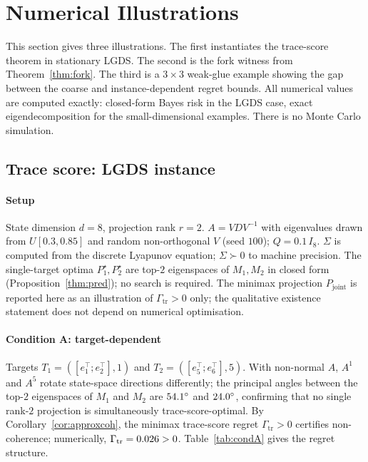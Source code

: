 \documentclass[final,3p,times]{elsarticle}
\begin{document}
\section{Numerical Illustrations}
\label{sec:numerics}

This section gives three illustrations.
The first instantiates the trace-score theorem in stationary LGDS.
The second is the fork witness from Theorem~\ref{thm:fork}.
The third is a $3\times 3$ weak-glue example showing the gap between the
coarse and instance-dependent regret bounds.
All numerical values are computed exactly: closed-form Bayes risk in the
LGDS case, exact eigendecomposition for the small-dimensional examples.
There is no Monte Carlo simulation.

\subsection{Trace score: LGDS instance}

\paragraph{Setup}
State dimension $d=8$, projection rank $r=2$.
$A=VDV^{-1}$ with eigenvalues drawn from $U[0.3,0.85]$ and random
non-orthogonal $V$ (seed $100$); $Q=0.1\,I_8$.
$\Sigma$ is computed from the discrete Lyapunov equation; $\Sigma\succ 0$
to machine precision.
The single-target optima $P_1^\star,P_2^\star$ are top-$2$ eigenspaces
of $M_1,M_2$ in closed form (Proposition~\ref{thm:pred}); no search is
required.
The minimax projection $P_{\mathrm{joint}}$ is reported here as an
illustration of $\Gamma_{\mathrm{tr}}>0$ only; the qualitative
existence statement does not depend on numerical optimisation.

\paragraph{Condition A: target-dependent}
Targets $T_1=([e_1^\top;e_2^\top],1)$ and $T_2=([e_5^\top;e_6^\top],5)$.
With non-normal $A$, $A^1$ and $A^5$ rotate state-space directions
differently; the principal angles between the top-$2$ eigenspaces of
$M_1$ and $M_2$ are $54.1^\circ$ and $24.0^\circ$,
confirming that no single rank-$2$ projection is simultaneously
trace-score-optimal.
By Corollary~\ref{cor:approxcoh}, the minimax trace-score regret
$\Gamma_{\mathrm{tr}}>0$ certifies non-coherence; numerically,
$\Gamma_{\mathrm{tr}}=0.026>0$.
Table~\ref{tab:condA} gives the regret structure.
\end{document}
